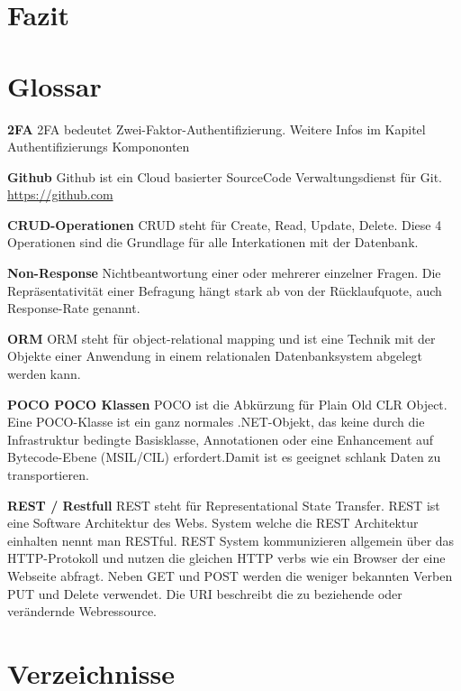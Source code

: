 \chapter{Fazit}\label{fazit-2}

\newpage

\appendix

\hypertarget{glossar}{\chapter{Glossar}\label{glossar}}

\textbf{2FA} 2FA bedeutet Zwei-Faktor-Authentifizierung. Weitere Infos
im Kapitel Authentifizierungs Kompononten

\textbf{Github} Github ist ein Cloud basierter SourceCode
Verwaltungsdienst für Git. \url{https://github.com}

\textbf{CRUD-Operationen} CRUD steht für Create, Read, Update, Delete.
Diese 4 Operationen sind die Grundlage für alle Interkationen mit der
Datenbank.

\textbf{Non-Response} Nichtbeantwortung einer oder mehrerer einzelner
Fragen. Die Repräsentativität einer Befragung hängt stark ab von der
Rücklaufquote, auch Response-Rate genannt.

\textbf{ORM} ORM steht für object-relational mapping und ist eine
Technik mit der Objekte einer Anwendung in einem relationalen
Datenbanksystem abgelegt werden kann.

\textbf{POCO POCO Klassen} POCO ist die Abkürzung für Plain Old CLR
Object. Eine POCO-Klasse ist ein ganz normales .NET-Objekt, das keine
durch die Infrastruktur bedingte Basisklasse, Annotationen oder eine
Enhancement auf Bytecode-Ebene (MSIL/CIL) erfordert.Damit ist es
geeignet schlank Daten zu transportieren.

\textbf{REST / Restfull} REST steht für Representational State Transfer.
REST ist eine Software Architektur des Webs. System welche die REST
Architektur einhalten nennt man RESTful. REST System kommunizieren
allgemein über das HTTP-Protokoll und nutzen die gleichen HTTP verbs wie
ein Browser der eine Webseite abfragt. Neben GET und POST werden die
weniger bekannten Verben PUT und Delete verwendet. Die URI beschreibt
die zu beziehende oder verändernde Webressource.

\chapter{Verzeichnisse}\label{verzeichnisse}

